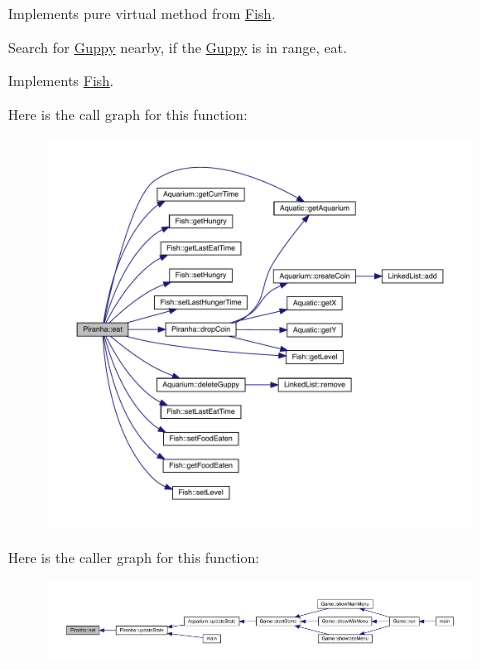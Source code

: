 Implements pure virtual method from \mbox{\hyperlink{class_fish}{Fish}}. 

Search for \mbox{\hyperlink{class_guppy}{Guppy}} nearby, if the \mbox{\hyperlink{class_guppy}{Guppy}} is in range, eat. 

Implements \mbox{\hyperlink{class_fish_af209980bd39b8de9b4bb38b7ad4edd04}{Fish}}.

Here is the call graph for this function\+:\nopagebreak
\begin{figure}[H]
\begin{center}
\leavevmode
\includegraphics[width=350pt]{class_piranha_ac48c0256edd56c427b3d82f6e0d4df82_cgraph}
\end{center}
\end{figure}
Here is the caller graph for this function\+:
\nopagebreak
\begin{figure}[H]
\begin{center}
\leavevmode
\includegraphics[width=350pt]{class_piranha_ac48c0256edd56c427b3d82f6e0d4df82_icgraph}
\end{center}
\end{figure}
\mbox{\label{class_piranha_a6b86e73b3e5a57ee0fdb768c24ab9b67}} 
